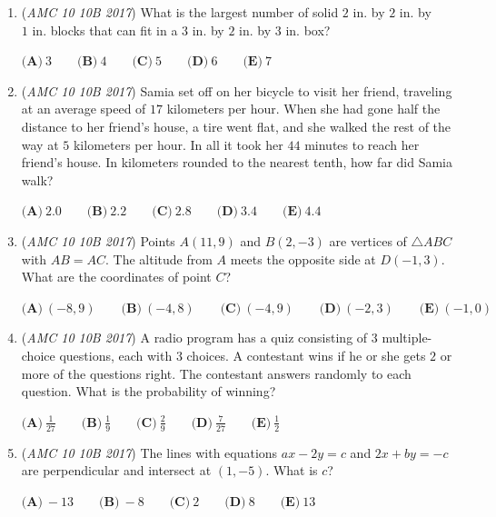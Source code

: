 \begin{enumerate}
 $\textbf{(A)}\ 10\qquad\textbf{(B)}\ 20\qquad\textbf{(C)}\ 30\qquad\textbf{(D)}\ 40\qquad\textbf{(E)}\ 50$


	\item (\textit{AMC 10 10B 2017}) What is the largest number of solid $2\text{ in.}$ by $2\text{ in.}$ by $1\text{ in.}$ blocks that can fit in a $3\text{ in.}$ by $2\text{ in.}$ by $3\text{ in.}$ box?


 $\textbf{(A)}\ 3\qquad\textbf{(B)}\ 4\qquad\textbf{(C)}\ 5\qquad\textbf{(D)}\ 6\qquad\textbf{(E)}\ 7$


	\item (\textit{AMC 10 10B 2017}) Samia set off on her bicycle to visit her friend, traveling at an average speed of $17$ kilometers per hour. When she had gone half the distance to her friend's house, a tire went flat, and she walked the rest of the way at $5$ kilometers per hour. In all it took her $44$ minutes to reach her friend's house. In kilometers rounded to the nearest tenth, how far did Samia walk?


 $\textbf{(A)}\ 2.0\qquad\textbf{(B)}\ 2.2\qquad\textbf{(C)}\ 2.8\qquad\textbf{(D)}\ 3.4\qquad\textbf{(E)}\ 4.4$


	\item (\textit{AMC 10 10B 2017}) Points $A(11, 9)$ and $B(2, -3)$ are vertices of $\triangle ABC$ with $AB=AC$. The altitude from $A$ meets the opposite side at $D(-1, 3)$. What are the coordinates of point $C$?


 $\textbf{(A)}\ (-8, 9)\qquad\textbf{(B)}\ (-4, 8)\qquad\textbf{(C)}\ (-4, 9)\qquad\textbf{(D)}\ (-2, 3)\qquad\textbf{(E)}\ (-1, 0)$


	\item (\textit{AMC 10 10B 2017}) A radio program has a quiz consisting of $3$ multiple-choice questions, each with $3$ choices. A contestant wins if he or she gets $2$ or more of the questions right. The contestant answers randomly to each question. What is the probability of winning?


 $\textbf{(A)}\ \frac{1}{27}\qquad\textbf{(B)}\ \frac{1}{9}\qquad\textbf{(C)}\ \frac{2}{9}\qquad\textbf{(D)}\ \frac{7}{27}\qquad\textbf{(E)}\ \frac{1}{2}$


	\item (\textit{AMC 10 10B 2017}) The lines with equations $ax-2y=c$ and $2x+by=-c$ are perpendicular and intersect at $(1, -5)$. What is $c$?


 $\textbf{(A)}\ -13\qquad\textbf{(B)}\ -8\qquad\textbf{(C)}\ 2\qquad\textbf{(D)}\ 8\qquad\textbf{(E)}\ 13$



\end{enumerate}
